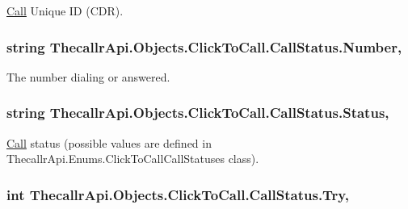 \hyperlink{class_thecallr_api_1_1_objects_1_1_click_to_call_1_1_call}{Call} Unique I\+D (C\+D\+R). 

\hypertarget{class_thecallr_api_1_1_objects_1_1_click_to_call_1_1_call_status_aff24253003dbfffc671a694a61a6d272}{
\subsubsection[{Number}]{\setlength{\rightskip}{0pt plus 5cm}string Thecallr\+Api.\+Objects.\+Click\+To\+Call.\+Call\+Status.\+Number\hspace{0.3cm}{\ttfamily [get]}, {\ttfamily [set]}}}\label{class_thecallr_api_1_1_objects_1_1_click_to_call_1_1_call_status_aff24253003dbfffc671a694a61a6d272}


The number dialing or answered. 

\hypertarget{class_thecallr_api_1_1_objects_1_1_click_to_call_1_1_call_status_a0737314b722623d37fcc228c15fb92e1}{
\subsubsection[{Status}]{\setlength{\rightskip}{0pt plus 5cm}string Thecallr\+Api.\+Objects.\+Click\+To\+Call.\+Call\+Status.\+Status\hspace{0.3cm}{\ttfamily [get]}, {\ttfamily [set]}}}\label{class_thecallr_api_1_1_objects_1_1_click_to_call_1_1_call_status_a0737314b722623d37fcc228c15fb92e1}


\hyperlink{class_thecallr_api_1_1_objects_1_1_click_to_call_1_1_call}{Call} status (possible values are defined in Thecallr\+Api.\+Enums.\+Click\+To\+Call\+Call\+Statuses class). 

\hypertarget{class_thecallr_api_1_1_objects_1_1_click_to_call_1_1_call_status_a740e9f272a7217ad55cd4ffae2c11a01}{
\subsubsection[{Try}]{\setlength{\rightskip}{0pt plus 5cm}int Thecallr\+Api.\+Objects.\+Click\+To\+Call.\+Call\+Status.\+Try\hspace{0.3cm}{\ttfamily [get]}, {\ttfamily [set]}}}\label{class_thecallr_api_1_1_objects_1_1_click_to_call_1_1_call_status_a740e9f272a7217ad55cd4ffae2c11a01}


